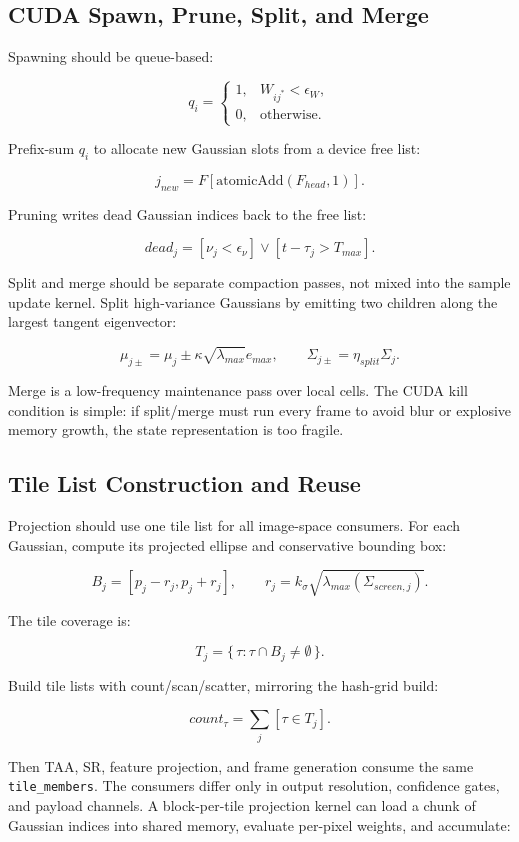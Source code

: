 \documentclass[11pt]{article}
\begin{document}
\subsection{CUDA Spawn, Prune, Split, and Merge}

Spawning should be queue-based:

\[
  q_i =
  \begin{cases}
  1, & W_{ij^*}<\epsilon_W,\\
  0, & \text{otherwise}.
  \end{cases}
\]

Prefix-sum $q_i$ to allocate new Gaussian slots from a device free list:

\[
  j_{new}=F[\mathrm{atomicAdd}(F_{head},1)].
\]

Pruning writes dead Gaussian indices back to the free list:

\[
  dead_j =
  [\nu_j < \epsilon_\nu]\lor[t-\tau_j>T_{max}].
\]

Split and merge should be separate compaction passes, not mixed into the
sample update kernel. Split high-variance Gaussians by emitting two children
along the largest tangent eigenvector:

\[
  \mu_{j\pm}=\mu_j\pm \kappa\sqrt{\lambda_{max}}e_{max},
  \qquad
  \Sigma_{j\pm}=\eta_{split}\Sigma_j.
\]

Merge is a low-frequency maintenance pass over local cells. The CUDA kill
condition is simple: if split/merge must run every frame to avoid blur or
explosive memory growth, the state representation is too fragile.

\subsection{Tile List Construction and Reuse}

Projection should use one tile list for all image-space consumers. For each
Gaussian, compute its projected ellipse and conservative bounding box:

\[
  B_j =
  [p_j-r_j, p_j+r_j],
  \qquad
  r_j = k_\sigma
  \sqrt{\lambda_{max}(\Sigma_{screen,j})}.
\]

The tile coverage is:

\[
  T_j =
  \{\,\tau : \tau \cap B_j \neq \emptyset\,\}.
\]

Build tile lists with count/scan/scatter, mirroring the hash-grid build:

\[
  count_\tau = \sum_j [\tau \in T_j].
\]

Then TAA, SR, feature projection, and frame generation consume the same
\texttt{tile\_members}. The consumers differ only in output resolution,
confidence gates, and payload channels. A block-per-tile projection kernel can
load a chunk of Gaussian indices into shared memory, evaluate per-pixel
weights, and accumulate:
\end{document}
